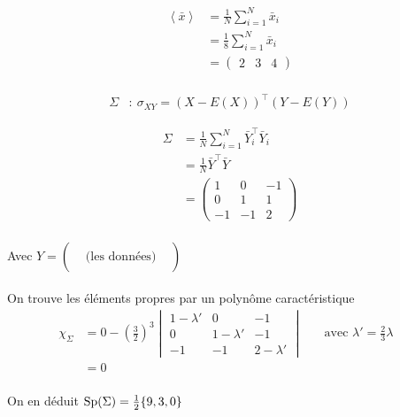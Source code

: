 \documentclass{article}
\renewcommand{\overline}{\bar}
\begin{document}
	\begin{align*}
		\left<\overline{x} \right> &= \frac{1}{N} \sum_{i=1}^{N} \overline{x}_i \\
		&= \frac{1}{8} \sum_{i=1}^{N} \overline{x}_i \\
		&= \begin{pmatrix} 2 & 3 & 4 \end{pmatrix}  \\
	\end{align*}

	\begin{align*}
		\Sigma &:\ \sigma_{XY} = (X - E(X))^\top (Y - E(Y))
	\end{align*}

	\begin{align*}
		\Sigma &= \frac{1}{N} \sum_{i=1}^{N} \overline{Y}_i^\top \overline{Y}_i \\
		&= \frac{1}{N} \overline{Y}^\top \overline{Y} \\
		&= \begin{pmatrix} 1 & 0 & -1 \\ 0 & 1 & 1 \\ -1 & -1 & 2 \end{pmatrix}  \\
	\end{align*}

	Avec $Y = \begin{pmatrix} & & \\ & \text{(les données)} & \\ & &  \end{pmatrix} $

	\paragraph{}
	
	On trouve les éléments propres par un polynôme caractéristique
	\begin{align*}
		\chi_{\Sigma} &= 0 - \left( \frac{3}{2} \right)^3 \begin{vmatrix} 1 - \lambda' & 0 & -1 \\ 0 & 1-\lambda' & -1 \\ -1 & -1 & 2 - \lambda' \end{vmatrix} \quad&\text{avec $\lambda' = \frac{2}{3} \lambda$ } \\
		&= 0 \\
	\end{align*}

	On en déduit $\operatorname{Sp}(\Sigma) = \frac{1}{2} \{9, 3, 0\} $
\end{document}
